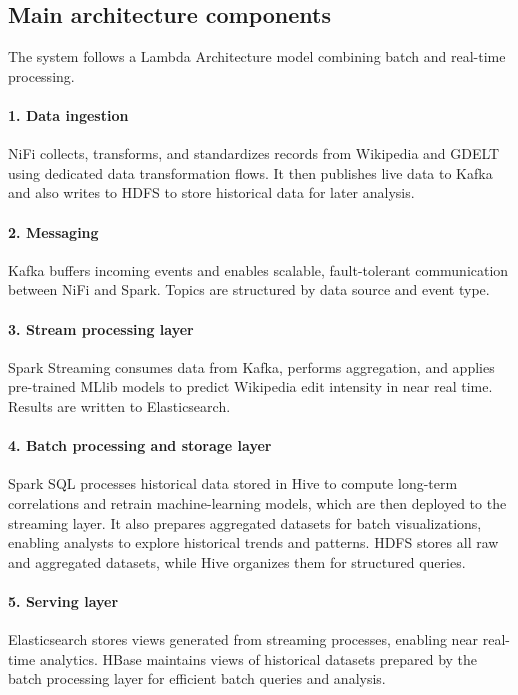 \documentclass{article}
\begin{document}
\subsection{Main architecture components}

The system follows a Lambda Architecture model combining batch and real-time processing.

\paragraph{1. Data ingestion}
NiFi collects, transforms, and standardizes records from Wikipedia and GDELT using dedicated data transformation flows. It then publishes live data to Kafka and also writes to HDFS to store historical data for later analysis.

\paragraph{2. Messaging}
Kafka buffers incoming events and enables scalable, fault-tolerant communication between NiFi
and Spark. Topics are structured by data source and event type.

\paragraph{3. Stream processing layer}
Spark Streaming consumes data from Kafka, performs aggregation, and applies pre-trained
MLlib models to predict Wikipedia edit intensity in near real time. Results are written to
Elasticsearch.

\paragraph{4. Batch processing and storage layer}
Spark SQL processes historical data stored in Hive to compute long-term correlations and retrain machine-learning models, which are then deployed to the streaming layer. It also prepares aggregated datasets for batch visualizations, enabling analysts to explore historical trends and patterns. HDFS stores all raw and aggregated datasets, while Hive organizes them for structured queries.

\paragraph{5. Serving layer}
Elasticsearch stores views generated from streaming processes, enabling near real-time analytics. HBase maintains views of historical datasets prepared by the batch processing layer for efficient batch queries and analysis.
\end{document}

